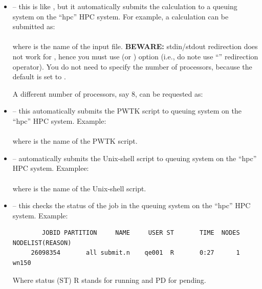 \documentclass[landscape]{foils}
\begin{document}
{\small
\begin{itemize}
\item {} -- this is like , but it
  automatically submits the calculation to a queuing system on the
  ``hpc'' HPC system. For example, a  calculation can be
  submitted
  as:\\[0.5em]
  \\[0.5em]
  where  is the name of the  input
  file. {\bf BEWARE:} stdin/stdout redirection does not work for
  , hence you must use  (or )
  option (i.e., do note use ``\cmd{<}'' redirection operator). You do
  not need to specify the number of processors, because the default is
  set to .

  A different number of processors, say 8, can be requested
  as:\\[0.5em]
  \vspace{0.5em}
  
\item {} -- this automatically submits the PWTK
  script to queuing system on the ``hpc'' HPC system. Example:\\[0.5em]
  \\[0.5em]
  where  is the name of the PWTK script.
  \vspace{0.5em}
\clearpage
\item {} -- automatically submits the Unix-shell
  script to queuing system on the ``hpc''  HPC system. Examplee:\\[0.5em]
  \\[0.5em]
  where  is the name of the Unix-shell script.
  \vspace{0.5em}

\item {} -- this checks the status of the job in the queuing
  system on the ``hpc'' HPC system. Example:\\[0.5em]
  {\green\burgundy
    \begin{verbatim}
        JOBID PARTITION     NAME     USER ST       TIME  NODES NODELIST(REASON)
     26098354       all submit.n    qe001  R       0:27      1 wn150
\end{verbatim}}
    Where status (ST) R stands for running and PD for pending.
  \vspace{0.5em}
  

\end{itemize}}
\end{document}
